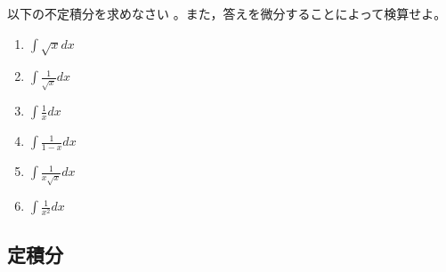 \documentclass[twocolumn,11pt]{jarticle}
\begin{document}
\exercise
以下の不定積分を求めなさい
。また，答えを微分することによって検算せよ。
\begin{enumerate}
\item\label{item:int x^(1/2)} $\displaystyle \int \sqrt{x} dx$
\item\label{item:int 1/x^(1/2)} $\displaystyle \int \frac{1}{\sqrt{x}} dx$
\item\label{item:int 1/x} $\displaystyle \int \frac{1}{x} dx$
\item\label{item:int 1/(1-x)} $\displaystyle \int \frac{1}{1-x} dx$
\item\label{item:int 1/x^(3/2)} $\displaystyle \int \frac{1}{x\sqrt{x}} dx$
\item\label{item:int 1/x^2} $\displaystyle \int \frac{1}{x^2} dx$
\end{enumerate}


\subsection{定積分}
\end{document}
